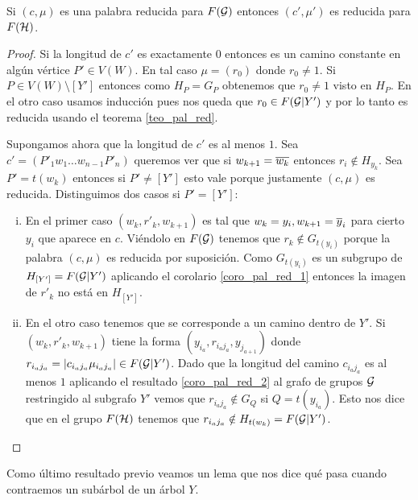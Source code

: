 \documentclass[tesis.tex]{subfiles}
\begin{document}
\begin{prop}\label{lema_pal_red_iso}
	Si $(c, \mu)$ es una palabra reducida para $F({\cal G})$ entonces $(c', \mu')$ es reducida para $F({\cal H})$.
\end{prop}
\begin{proof}
	Si la longitud de $c'$ es exactamente $0$ entonces es un camino constante en algún vértice $P' \in V(W)$. 
	En tal caso $\mu = (r_0)$ donde $r_0 \neq 1$.
	Si $P \in V(W) \setminus [Y']$ entonces como $H_P = G_P$ obtenemos que $r_0 \neq 1$ visto en $H_P$.
	En el otro caso usamos inducción pues nos queda que $r_0 \in F({\cal G} | Y')$ y por lo tanto es reducida usando el teorema \ref{teo_pal_red}.
	
	Supongamos ahora que la longitud de $c'$ es al menos $1$.
	Sea $c' = (P'_1w_1 \dots w_{n-1}P'_n)$ queremos ver que si $w_{k+1} = \overline{w_k}$ entonces $r_i \notin H_{y_k}$.	
	Sea $P' = t(w_k)$ entonces si $P' \neq [Y']$ esto vale porque justamente $(c, \mu)$ es reducida.
	Distinguimos dos casos si $P' = [Y']$:
	\begin{enumerate}[i)]
		\item En el primer caso $(w_{k},r'_k,w_{k+1})$ es tal que $w_{k} = y_i, w_{k+1} = \overline y_i$ para cierto $y_i$ que aparece en $c$. 
		Viéndolo en $F({\cal G})$ tenemos que $r_k \notin G_{t(y_i)}$ porque la palabra $(c, \mu)$ es reducida por suposición.
		Como $G_{t(y_i)}$ es un subgrupo de $H_{[Y']} = F({\cal G} | Y')$ aplicando el corolario \ref{coro_pal_red_1} entonces la imagen de $r'_k$ no está en $H_{[Y']}$.
		
		\item En el otro caso tenemos que se corresponde a un camino dentro de $Y'$.
		Si $(w_{k},r'_k,w_{k+1})$ tiene la forma $(y_{i_a},r_{i_aj_a},y_{j_{a+1}})$ donde $r_{i_aj_a} = |c_{i_aj_a} \mu_{i_aj_a} | \in F({\cal G} | Y')$. 
		Dado que la longitud del camino $c_{i_aj_a}$ es al menos $1$ aplicando el resultado \ref{coro_pal_red_2} al grafo de grupos ${\cal G}$ restringido al subgrafo $Y'$ vemos que $r_{i_aj_a} \notin G_Q$ si $Q =t(y_{i_a})$.
		Esto nos dice que en el grupo $F({\cal H})$ tenemos que $r_{i_aj_a} \notin H_{t(w_k)} = F({\cal G} | Y')$.
	\end{enumerate}	
\end{proof}

Como último resultado previo veamos un lema que nos dice qué pasa cuando contraemos un subárbol de un árbol $Y$.
\end{document}
